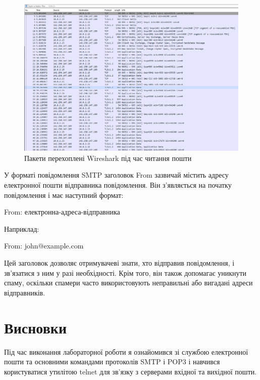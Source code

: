 \documentclass{article}
\begin{document}
\begin{normalsize}
\begin{figure}[H]
	\centering
	\includegraphics[width=\textwidth]{31}
	\caption{Пакети перехоплені Wireshark під час читання пошти}
\end{figure}

У форматі повідомлення SMTP заголовок From зазвичай містить адресу електронної пошти відправника повідомлення. Він з'являється на початку повідомлення і має наступний формат:

From: електронна-адреса-відправника

Наприклад:

From: john@example.com

Цей заголовок дозволяє отримувачеві знати, хто відправив повідомлення, і зв'язатися з ним у разі необхідності. Крім того, він також допомагає уникнути спаму, оскільки спамери часто використовують неправильні або вигадані адреси відправників.

\section*{Висновки}
Під час виконання лабораторної роботи я ознайомився зі службою електронної пошти та основними командами протоколів SMTP і POP3 і навчився користуватися утилітою telnet для зв’язку з серверами вхідної та вихідної пошти.
	    
\end{normalsize}
\end{document}

